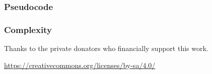\documentclass{article}
\newtheorem*{theorem A}{Theorem A}
\newtheorem*{theorem B}{N\"olker's Theorem}
\theoremstyle{remark}
\theoremstyle{remark}
\begin{document}
\subsubsection{Pseudocode}
\label{sss:pseudocode}
\subsubsection{Complexity}
\label{sss:complexity}
Thanks to the private donators who financially support this work.
\begin{center}
	\url{https://creativecommons.org/licenses/by-sa/4.0/}
\end{center}
%
%
%

%
%
\end{document}
